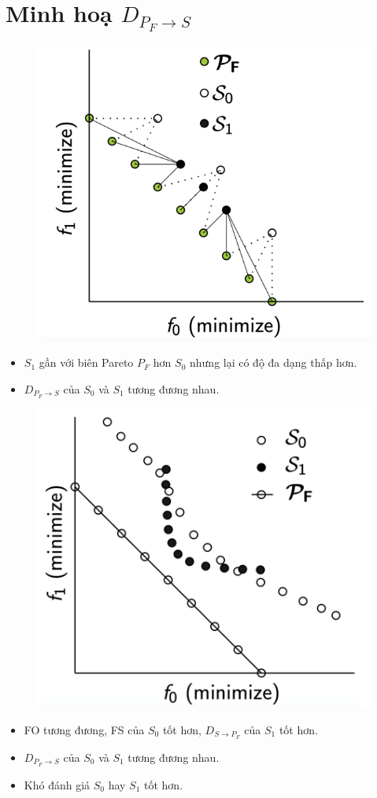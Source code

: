 \documentclass{book}
\begin{document}
\section*{Minh hoạ $D_{P_F \rightarrow S}$}

\begin{figure}[H]
        \centering
        \includegraphics[width=0.5\linewidth]{images/GA-7-8_50.png}
    \end{figure}

\begin{itemize}    
    \item $S_1$ gần với biên Pareto $P_F$ hơn $S_0$ nhưng lại có độ đa dạng thấp hơn.
    \item $D_{P_F \rightarrow S}$ của $S_0$ và $S_1$ tương đương nhau.
\end{itemize}


\begin{figure}[H]
    \centering
    \includegraphics[width=0.5\linewidth]{images/GA-7-8_51.png}
\end{figure}

\begin{itemize}
    \item FO tương đương, FS của $S_0$ tốt hơn, $D_{S \rightarrow P_F}$ của $S_1$ tốt hơn.
    \item $D_{P_F \rightarrow S}$ của $S_0$ và $S_1$ tương đương nhau.
    \item Khó đánh giá $S_0$ hay $S_1$ tốt hơn.
\end{itemize}
\end{document}
